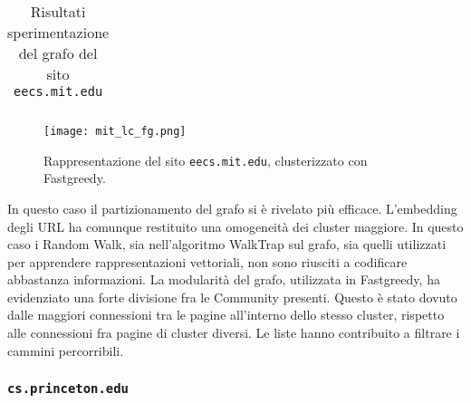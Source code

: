 \begin{table}[H]
\begin{tabular}{| l | c | c | c | c | c | c |}
	\end{tabular}
	\caption{Risultati sperimentazione del grafo del sito \texttt{eecs.mit.edu}}
	\label{metricheMit}
\end{table}

\begin{figure}[ht!]
	\centering
	\texttt{[image: mit\_lc\_fg.png]}
	\caption{Rappresentazione del sito \texttt{eecs.mit.edu}, clusterizzato con Fastgreedy.}
	\label{lc_embText_km}
\end{figure}
In questo caso il partizionamento del grafo si è rivelato più efficace. L'embedding degli URL ha comunque restituito una omogeneità dei cluster maggiore. In questo caso i Random Walk, sia nell'algoritmo WalkTrap sul grafo, sia quelli utilizzati per apprendere rappresentazioni vettoriali, non sono riusciti a codificare abbastanza informazioni. La modularità del grafo, utilizzata in Fastgreedy, ha evidenziato una forte divisione fra le Community presenti. Questo è stato dovuto dalle maggiori connessioni tra le pagine all'interno dello stesso cluster, rispetto alle connessioni fra pagine di cluster diversi. Le liste hanno contribuito a filtrare i cammini percorribili.
\subsubsection{\texttt{cs.princeton.edu}}


